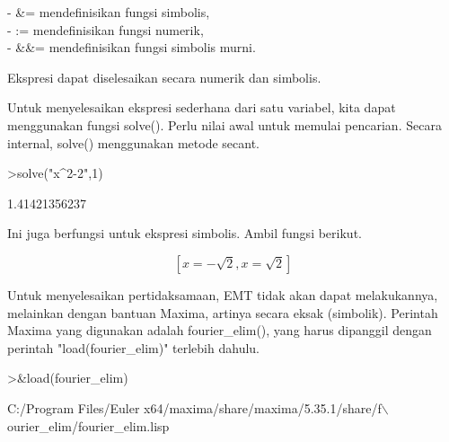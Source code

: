 \documentclass[a4paper,10pt]{article}
\begin{document}
\begin{eulernotebook}
\begin{eulercomment}
\begin{eulercomment}
\begin{eulercomment}
\begin{eulercomment}
\begin{eulercomment}
- \&= mendefinisikan fungsi simbolis,\\
- := mendefinisikan fungsi numerik,\\
- \&\&= mendefinisikan fungsi simbolis murni.

\begin{eulercomment}
\begin{eulercomment}
Ekspresi dapat diselesaikan secara numerik dan simbolis.

Untuk menyelesaikan ekspresi sederhana dari satu variabel, kita dapat
menggunakan fungsi solve(). Perlu nilai awal untuk memulai pencarian.
Secara internal, solve() menggunakan metode secant.
\end{eulercomment}
\begin{eulerprompt}
>solve("x^2-2",1)
\end{eulerprompt}
\begin{euleroutput}
  1.41421356237
\end{euleroutput}
\begin{eulercomment}
Ini juga berfungsi untuk ekspresi simbolis. Ambil fungsi berikut.
\end{eulercomment}
\begin{eulerformula}
\[
\left[ x=-\sqrt{2} , x=\sqrt{2} \right] 
\]
\end{eulerformula}
\begin{eulercomment}
Untuk menyelesaikan pertidaksamaan, EMT tidak akan dapat melakukannya,
melainkan dengan bantuan Maxima, artinya secara eksak (simbolik).
Perintah Maxima yang digunakan adalah fourier\_elim(), yang harus
dipanggil dengan perintah "load(fourier\_elim)" terlebih dahulu.
\end{eulercomment}
\begin{eulerprompt}
>&load(fourier_elim)
\end{eulerprompt}
\begin{euleroutput}
  
          C:/Program Files/Euler x64/maxima/share/maxima/5.35.1/share/f\(\backslash\)
  ourier_elim/fourier_elim.lisp
  

\end{euleroutput}
\end{eulercomment}
\end{eulercomment}
\end{eulercomment}
\end{eulercomment}
\end{eulercomment}
\end{eulercomment}
\end{eulernotebook}
\end{document}
